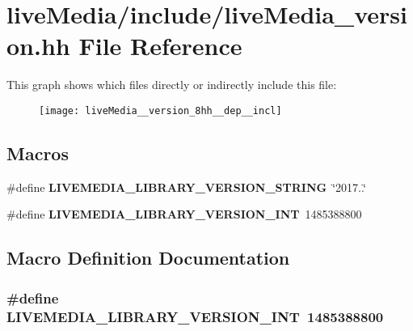 \section{live\+Media/include/live\+Media\+\_\+version.hh File Reference}
\label{liveMedia__version_8hh}
This graph shows which files directly or indirectly include this file\+:
\nopagebreak
\begin{figure}[H]
\begin{center}
\leavevmode
\texttt{[image: liveMedia\_\_version\_8hh\_\_dep\_\_incl]}
\end{center}
\end{figure}
\subsection*{Macros}
\begin{DoxyCompactItemize}
\item 
\#define {\bf L\+I\+V\+E\+M\+E\+D\+I\+A\+\_\+\+L\+I\+B\+R\+A\+R\+Y\+\_\+\+V\+E\+R\+S\+I\+O\+N\+\_\+\+S\+T\+R\+I\+N\+G}~\char`\"{}2017..\char`\"{}
\item 
\#define {\bf L\+I\+V\+E\+M\+E\+D\+I\+A\+\_\+\+L\+I\+B\+R\+A\+R\+Y\+\_\+\+V\+E\+R\+S\+I\+O\+N\+\_\+\+I\+N\+T}~1485388800
\end{DoxyCompactItemize}


\subsection{Macro Definition Documentation}
\subsubsection[{L\+I\+V\+E\+M\+E\+D\+I\+A\+\_\+\+L\+I\+B\+R\+A\+R\+Y\+\_\+\+V\+E\+R\+S\+I\+O\+N\+\_\+\+I\+N\+T}]{\setlength{\rightskip}{0pt plus 5cm}\#define L\+I\+V\+E\+M\+E\+D\+I\+A\+\_\+\+L\+I\+B\+R\+A\+R\+Y\+\_\+\+V\+E\+R\+S\+I\+O\+N\+\_\+\+I\+N\+T~1485388800}\label{liveMedia__version_8hh_a2981fe486534701bf1d988f2bd1c2290}


